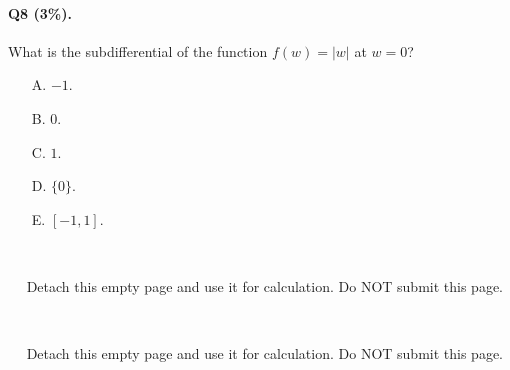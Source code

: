 \documentclass[11pt]{article}
\numberwithin{equation}{section}
\begin{document}
\paragraph{Q8 (3\%).} 
What is the subdifferential of the function $f(w) = |w|$ at $w = 0$?
\begin{itemize}
	\item[A.]
	$-1$.
	\item[B.]
	$0$.
	\item[C.]
	$1$.
	\item[D.]
	$\{ 0 \}$.
	\item[E.]
	$[-1, 1]$.
\end{itemize}


\newpage
~~

\newpage
~~
Detach this empty page and use it for calculation.
Do NOT submit this page.

\newpage
~~

\newpage
~~
Detach this empty page and use it for calculation.
Do NOT submit this page.




%

%
%
%
\end{document}

